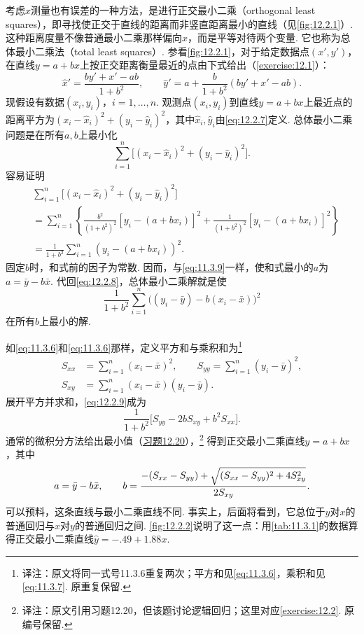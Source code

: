 考虑$x$测量也有误差的一种方法，是进行正交最小二乘（orthogonal least squares），即寻找使正交于直线的距离而非竖直距离最小的直线（见\autoref{fig:12.2.1}）. 这种距离度量不像普通最小二乘那样偏向$x$，而是平等对待两个变量. 它也称为总体最小二乘法（total least squares）. 参看\autoref{fig:12.2.1}，对于给定数据点$(x',y')$，在直线$y=a+bx$上按正交距离衡量最近的点由下式给出（\autoref{exercise:12.1}）：
\begin{equation}\label{eq:12.2.7}
\hat x'=\frac{by'+x'-ab}{1+b^2},\qquad
\hat y'=a+\frac b{1+b^2}(by'+x'-ab).
\end{equation}
现假设有数据$(x_i,y_i)$，$i=1,\ldots,n$. 观测点$(x_i,y_i)$到直线$y=a+bx$上最近点的距离平方为$(x_i-\hat x_i)^2+(y_i-\hat y_i)^2$，其中$\hat x_i,\hat y_i$由\eqref{eq:12.2.7}定义. 总体最小二乘问题是在所有$a,b$上最小化
$$\sum_{i=1}^n\bigl[(x_i-\hat x_i)^2+(y_i-\hat y_i)^2\bigr].$$
容易证明
\begin{equation}\label{eq:12.2.8}
\begin{aligned}
&\sum_{i=1}^n\bigl[(x_i-\hat x_i)^2+(y_i-\hat y_i)^2\bigr]\\
&=\sum_{i=1}^n\left\{\frac{b^2}{(1+b^2)^2}[y_i-(a+bx_i)]^2
+\frac1{(1+b^2)^2}[y_i-(a+bx_i)]^2\right\}\\
&=\frac1{1+b^2}\sum_{i=1}^n(y_i-(a+bx_i))^2.
\end{aligned}
\end{equation}
固定$b$时，和式前的因子为常数. 因而，与\eqref{eq:11.3.9}一样，使和式最小的$a$为$a=\bar y-b\bar x$. 代回\eqref{eq:12.2.8}，总体最小二乘解就是使
\begin{equation}\label{eq:12.2.9}
\frac1{1+b^2}\sum_{i=1}^n\bigl((y_i-\bar y)-b(x_i-\bar x)\bigr)^2
\end{equation}
在所有$b$上最小的解.

如\eqref{eq:11.3.6}和\eqref{eq:11.3.6}那样，定义平方和与乘积和为\footnote{译注：原文将同一式号11.3.6重复两次；平方和见\eqref{eq:11.3.6}，乘积和见\eqref{eq:11.3.7}. 原重复保留.}
\begin{equation}\label{eq:12.2.10}
\begin{aligned}S_{xx}&=\sum_{i=1}^n(x_i-\bar x)^2,\qquad S_{yy}=\sum_{i=1}^n(y_i-\bar y)^2,\\
S_{xy}&=\sum_{i=1}^n(x_i-\bar x)(y_i-\bar y).
\end{aligned}
\end{equation}
展开平方并求和，\eqref{eq:12.2.9}成为
$$\frac1{1+b^2}\bigl[S_{yy}-2bS_{xy}+b^2S_{xx}\bigr].$$
通常的微积分方法给出最小值（\hyperref[exercise:12.2]{习题12.20}），\footnote{译注：原文引用习题12.20，但该题讨论逻辑回归；这里对应\autoref{exercise:12.2}. 原编号保留.} 得到正交最小二乘直线$y=a+bx$，其中
\begin{equation}\label{eq:12.2.11}\index{SI0612@斜率}
a=\bar y-b\bar x,\qquad b=\frac{-(S_{xx}-S_{yy})+\sqrt{(S_{xx}-S_{yy})^2+4S_{xy}^2}}{2S_{xy}}.
\end{equation}
可以预料，这条直线与最小二乘直线不同. 事实上，后面将看到，它总位于$y$对$x$的普通回归与$x$对$y$的普通回归之间. \autoref{fig:12.2.2}说明了这一点：用\autoref{tab:11.3.1}的数据算得正交最小二乘直线$\hat y=-.49+1.88x$.

